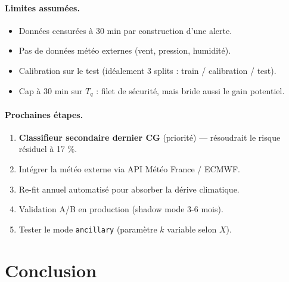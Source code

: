 \documentclass[11pt,a4paper]{article}
\begin{document}
\paragraph{Limites assumées.}
\begin{itemize}[topsep=2pt]
    \item Données censurées à 30 min par construction d'une alerte.
    \item Pas de données météo externes (vent, pression, humidité).
    \item Calibration sur le test (idéalement 3 splits : train / calibration / test).
    \item Cap à 30 min sur $T_q$ : filet de sécurité, mais bride aussi le gain potentiel.
\end{itemize}

\paragraph{Prochaines étapes.}
\begin{enumerate}[topsep=2pt]
    \item \textbf{Classifieur secondaire \og dernier CG \fg{}} (priorité) — résoudrait le
    risque résiduel à 17 \%.
    \item Intégrer la météo externe via API Météo France / ECMWF.
    \item Re-fit annuel automatisé pour absorber la dérive climatique.
    \item Validation A/B en production (shadow mode 3-6 mois).
    \item Tester le mode \texttt{ancillary} (paramètre $k$ variable selon $X$).
\end{enumerate}

\section{Conclusion}
\end{document}
